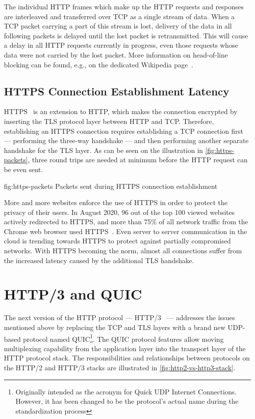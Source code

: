 The individual HTTP frames which make up the HTTP requests and responses are interleaved and
transferred over TCP as a single stream of data. When a TCP packet carrying a part of this stream is
lost, delivery of the data in all following packets is delayed until the lost packet is
retransmitted. This will cause a delay in all HTTP requests currently in progress, even those
requests whose data were not carried by the lost packet. More information on head-of-line blocking
can be found, e.g., on the dedicated Wikipedia page~\cite{wiki:head-of-line-blocking}.

\subsection*{HTTPS Connection Establishment Latency}

HTTPS~\cite{rfc2818} is an extension to HTTP, which makes the connection encrypted by inserting the
TLS protocol layer between HTTP and TCP\@. Therefore, establishing an HTTPS connection requires
establishing a TCP connection first --- performing the three-way handshake --- and then performing
another separate handshake for the TLS layer. As can be seen on the illustration in
\autoref{fig:https-packets}, three round trips are needed at minimum before the HTTP request can be
even sent.

\begin{myFigure} {fig:https-packets} {Packets sent during HTTPS connection establishment}

  \resizebox{0.8\linewidth}{!}{}

\end{myFigure}

More and more websites enforce the use of HTTPS in order to protect the privacy of their users. In
August 2020, 96 out of the top 100 viewed websites actively redirected to HTTPS, and more than 75\%
of all network traffic from the Chrome web browser used HTTPS~\cite{googleTransparency}. Even server
to server communication in the cloud is trending towards HTTPS to protect against partially
compromised networks. With HTTPS becoming the norm, almost all connections suffer from the increased
latency caused by the additional TLS handshake.

\section{HTTP/3 and QUIC}

The next version of the HTTP protocol --- HTTP/3~\cite{draft-ietf-quic-http} --- addresses the issues
mentioned above by replacing the TCP and TLS layers with a brand new UDP-based protocol named
QUIC\footnote{Originally intended as the acronym for Quick UDP Internet Connections. However, it has
  been changed to be the protocol's actual name during the standardization process}. The QUIC
protocol features allow moving multiplexing capability from the application layer into the transport
layer of the HTTP protocol stack. The responsibilities and relationships between protocols on the
HTTP/2 and HTTP/3 stacks are illustrated in \autoref{fig:http2-vs-http3-stack}.

